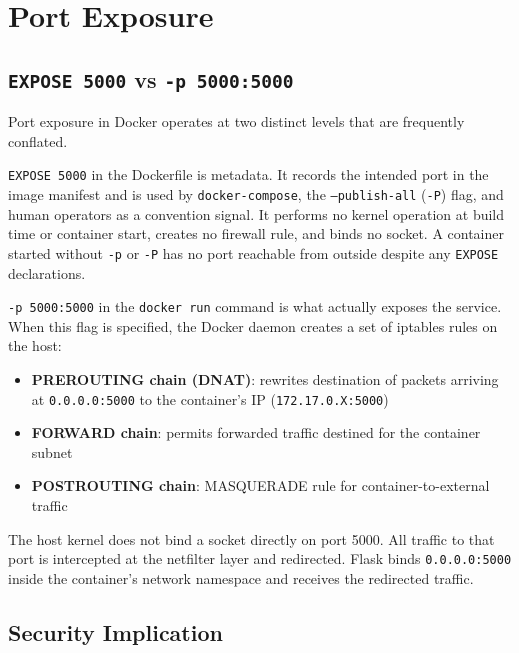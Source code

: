 \vspace{0.3cm}

\section{Port Exposure}
\label{sec:portexposure}

\subsection*{\texttt{EXPOSE 5000} vs \texttt{-p 5000:5000}}

Port exposure in Docker operates at two distinct levels that are frequently conflated.

\texttt{EXPOSE 5000} in the Dockerfile is metadata. It records the intended port in the image manifest and is used by \texttt{docker-compose}, the \texttt{--publish-all} (\texttt{-P}) flag, and human operators as a convention signal. It performs no kernel operation at build time or container start, creates no firewall rule, and binds no socket. A container started without \texttt{-p} or \texttt{-P} has no port reachable from outside despite any \texttt{EXPOSE} declarations.

\texttt{-p 5000:5000} in the \texttt{docker run} command is what actually exposes the service. When this flag is specified, the Docker daemon creates a set of iptables rules on the host:

\begin{itemize}
    \item \textbf{PREROUTING chain (DNAT)}: rewrites destination of packets arriving at \texttt{0.0.0.0:5000} to the container's IP (\texttt{172.17.0.X:5000})
    \item \textbf{FORWARD chain}: permits forwarded traffic destined for the container subnet
    \item \textbf{POSTROUTING chain}: MASQUERADE rule for container-to-external traffic
\end{itemize}

The host kernel does not bind a socket directly on port 5000. All traffic to that port is intercepted at the netfilter layer and redirected. Flask binds \texttt{0.0.0.0:5000} inside the container's network namespace and receives the redirected traffic.

\subsection*{Security Implication}

